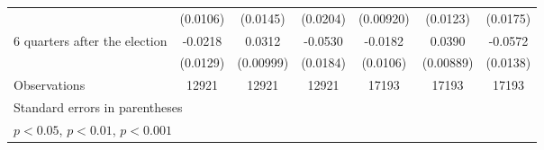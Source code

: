 \begin{table}[!ht]
\begin{tabular}{l*{6}{c}}
                    &    (0.0106)         &    (0.0145)         &    (0.0204)         &   (0.00920)         &    (0.0123)         &    (0.0175)         \\
[1em]
 6 quarters after the election&     -0.0218         &      0.0312\sym{**} &     -0.0530\sym{**} &     -0.0182         &      0.0390\sym{***}&     -0.0572\sym{***}\\
                    &    (0.0129)         &   (0.00999)         &    (0.0184)         &    (0.0106)         &   (0.00889)         &    (0.0138)         \\
\hline
Observations        &       12921         &       12921         &       12921         &       17193         &       17193         &       17193         \\
\hline\hline
\multicolumn{7}{l}{\footnotesize Standard errors in parentheses}\\
\multicolumn{7}{l}{\footnotesize \sym{*} \(p<0.05\), \sym{**} \(p<0.01\), \sym{***} \(p<0.001\)}\\
\end{tabular}
\end{table}
